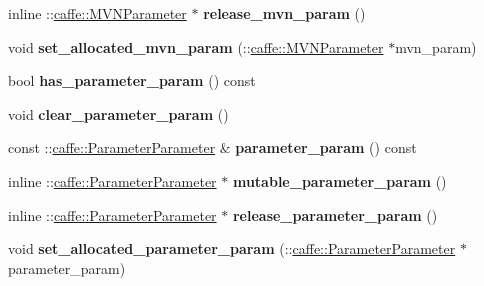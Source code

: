 \begin{DoxyCompactItemize}
inline \+::\mbox{\hyperlink{classcaffe_1_1_m_v_n_parameter}{caffe\+::\+M\+V\+N\+Parameter}} $\ast$ {\bfseries release\+\_\+mvn\+\_\+param} ()
\item 
\mbox{\label{classcaffe_1_1_layer_parameter_aa1a619f927db3639e097ae494d103516}} 
void {\bfseries set\+\_\+allocated\+\_\+mvn\+\_\+param} (\+::\mbox{\hyperlink{classcaffe_1_1_m_v_n_parameter}{caffe\+::\+M\+V\+N\+Parameter}} $\ast$mvn\+\_\+param)
\item 
\mbox{\label{classcaffe_1_1_layer_parameter_ad8d8aa28dd5631d8be3275d43c888d14}} 
bool {\bfseries has\+\_\+parameter\+\_\+param} () const
\item 
\mbox{\label{classcaffe_1_1_layer_parameter_a11f3c645acad540f84694322058f2b06}} 
void {\bfseries clear\+\_\+parameter\+\_\+param} ()
\item 
\mbox{\label{classcaffe_1_1_layer_parameter_a6e364ec5a2c544e5ab86da5238a60066}} 
const \+::\mbox{\hyperlink{classcaffe_1_1_parameter_parameter}{caffe\+::\+Parameter\+Parameter}} \& {\bfseries parameter\+\_\+param} () const
\item 
\mbox{\label{classcaffe_1_1_layer_parameter_a251ec576b9030b5c28d24094fa9705da}} 
inline \+::\mbox{\hyperlink{classcaffe_1_1_parameter_parameter}{caffe\+::\+Parameter\+Parameter}} $\ast$ {\bfseries mutable\+\_\+parameter\+\_\+param} ()
\item 
\mbox{\label{classcaffe_1_1_layer_parameter_aa29c8e40795c89b5da79bf1c829f4a56}} 
inline \+::\mbox{\hyperlink{classcaffe_1_1_parameter_parameter}{caffe\+::\+Parameter\+Parameter}} $\ast$ {\bfseries release\+\_\+parameter\+\_\+param} ()
\item 
\mbox{\label{classcaffe_1_1_layer_parameter_a17c5567bc4547f1328013d487483f823}} 
void {\bfseries set\+\_\+allocated\+\_\+parameter\+\_\+param} (\+::\mbox{\hyperlink{classcaffe_1_1_parameter_parameter}{caffe\+::\+Parameter\+Parameter}} $\ast$parameter\+\_\+param)
\item 
\mbox{\label{classcaffe_1_1_layer_parameter_a45dc21c1a05138ff5b27928e2b71ccfa}} 

\end{DoxyCompactItemize}
